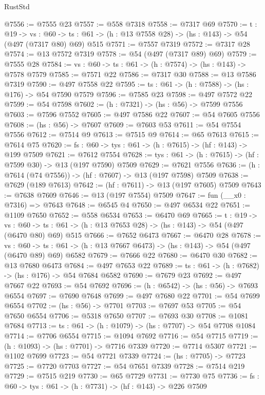 \begin{lexlean}{RustStd}
\begin{coremodule}
@7556 := @7555 @23
@7557 := @558 @7318
@7558 := @7317 @69
@7570 := {t : @19} ->
  {vs : @60} -> {ts : @61} -> (h : @13 @7558 @28) -> (hs : @143) -> @54 (@497 (@7317 @80) @69) @515
@7571 := @7557 @7319
@7572 := @7317 @28
@7574 := @13 @7572 @7319
@7578 := @54 (@497 (@7317 @89) @69)
@7579 := @7555 @28
@7584 := {vs : @60} -> {ts : @61} -> (h : @7574) -> (hs : @143) -> @7578 @7579
@7585 := @7571 @22
@7586 := @7317 @30
@7588 := @13 @7586 @7319
@7590 := @497 @7558 @22
@7595 := {ts : @61} -> (h : @7588) -> (hs : @176) -> @54 @7590 @7579
@7596 := @7585 @23
@7598 := @497 @7572 @22
@7599 := @54 @7598
@7602 := (h : @7321) -> (hs : @56) -> @7599 @7556
@7603 := @7596 @7552
@7605 := @497 @7586 @22
@7607 := @54 @7605 @7556
@7608 := (hs : @56) -> @7607
@7609 := @7603 @53
@7611 := @54 @7554 @7556
@7612 := @7514 @9
@7613 := @7515 @9
@7614 := @65 @7613
@7615 := @7614 @75
@7620 := {fs : @60} -> {tys : @61} -> (h : @7615) -> (hf : @143) -> @199 @7509
@7621 := @7612 @7554
@7628 := {tys : @61} -> (h : @7615) -> (hf : @7599 @30) -> @13 (@197 @7590) @7509
@7629 := @7621 @7556
@7636 := (h : @7614 (@74 @7556)) -> (hf : @7607) -> @13 (@197 @7598) @7509
@7638 := @7629 (@189 @7613)
@7642 := (hf : @7611) -> @13 (@197 @7605) @7509
@7643 := @7638 @7609
@7646 := @13 (@197 @7554) @7509
@7647 := fun (__x0 : @7316) => @7643
@7648 := @6545 @4
@7650 := @497 @6534 @22
@7651 := @1109 @7650
@7652 := @558 @6534
@7653 := @6470 @69
@7665 := {t : @19} ->
  {vs : @60} -> {ts : @61} -> (h : @13 @7653 @28) -> (hs : @143) -> @54 (@497 (@6470 @80) @69) @515
@7666 := @7652 @6473
@7667 := @6470 @28
@7678 := {vs : @60} ->
  {ts : @61} -> (h : @13 @7667 @6473) -> (hs : @143) -> @54 (@497 (@6470 @89) @69) @6582
@7679 := @7666 @22
@7680 := @6470 @30
@7682 := @13 @7680 @6473
@7684 := @497 @7653 @22
@7689 := {ts : @61} -> (h : @7682) -> (hs : @176) -> @54 @7684 @6582
@7690 := @7679 @23
@7692 := @497 @7667 @22
@7693 := @54 @7692
@7696 := (h : @6542) -> (hs : @56) -> @7693 @6554
@7697 := @7690 @7648
@7699 := @497 @7680 @22
@7701 := @54 @7699 @6554
@7702 := (hs : @56) -> @7701
@7703 := @7697 @53
@7705 := @54 @7650 @6554
@7706 := @5318 @7650
@7707 := @7693 @30
@7708 := @1081 @7684
@7713 := {ts : @61} -> (h : @1079) -> (hs : @7707) -> @54 @7708 @1084
@7714 := @7706 @6554
@7715 := @1094 @7692
@7716 := @54 @7715
@7719 := (h : @1093) -> (hs : @7701) -> @7716 @7339
@7720 := @7714 @5307
@7721 := @1102 @7699
@7723 := @54 @7721 @7339
@7724 := (hs : @7705) -> @7723
@7725 := @7720 @7703
@7727 := @54 @7651 @7339
@7728 := @7514 @219
@7729 := @7515 @219
@7730 := @65 @7729
@7731 := @7730 @75
@7736 := {fs : @60} -> {tys : @61} -> (h : @7731) -> (hf : @143) -> @226 @7509

\end{coremodule}
\end{lexlean}
